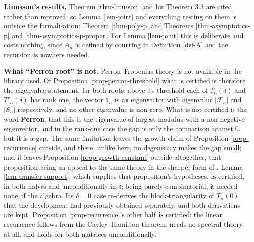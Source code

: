 \documentclass[11pt, a4paper, abstract=yes]{scrartcl}
\theoremstyle{definition}
\theoremstyle{remark}
\theoremstyle{plain}
\newcommand{\vek}[1]{\boldsymbol{#1}}
\begin{document}
\begin{itemize}
\textbf{Linusson's results.} Theorem \ref{thm-linusson} and his Theorem 3.3 are cited rather than reproved,
so Lemma \ref{lem-joint} and everything resting on them is outside the formalisation: Theorem
\ref{thm-poly-p} and Theorems \ref{thm-asymptotics-p} and \ref{thm-asymptotics-p-proper}. For Lemma
\ref{lem-joint} this is deliberate and costs nothing, since \(A_n\) is defined by counting in
Definition \ref{def-A} and the recursion is nowhere needed.

\textbf{What ``Perron root'' is not.} Perron--Frobenius theory is not available in the library used. Of
Proposition \ref{prop-perron-threshold} what is certified is therefore the eigenvalue statement, for
both roots: above its threshold each of \(T_n(\delta)\) and \(T'_n(\delta)\) has rank one, the vector
\(\vek 1_n\) is an eigenvector with eigenvalue \(\lvert\mathcal F_n\rvert\) and
\(\lvert S_n\rvert\) respectively, and no other eigenvalue is non-zero. What is not certified is
the word \textbf{Perron},
that this is the eigenvalue of largest modulus with a non-negative eigenvector, and in the
rank-one case the gap is only the comparison against \(0\), but it is a gap. The same limitation
leaves the growth claim of Proposition \ref{prop-recurrence} outside, and there, unlike here, no
degeneracy makes the gap small; and it leaves Proposition \ref{prop-growth-constant} outside
altogether, that proposition being an appeal to the same theory in the sharper form of
\autocite[Theorem V.7]{FlajoletSedgewick2009}. Lemma \ref{lem-transfer-support}, which supplies that
proposition's hypotheses, \textbf{is} certified, in both halves and unconditionally in \(\delta\);
being purely combinatorial, it needed none of the algebra. Its \(\delta=0\) case re-derives the
block-triangularity of \(T_n(0)\) that the development had previously obtained separately, and
both derivations are kept. Proposition \ref{prop-recurrence}'s other half \textbf{is} certified: the linear recurrence
follows from the Cayley--Hamilton theorem, needs no spectral theory at all, and holds for both
matrices unconditionally.


\end{itemize}
\end{document}
